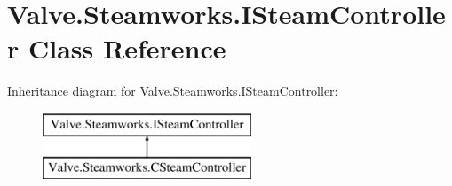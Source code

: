 \hypertarget{classValve_1_1Steamworks_1_1ISteamController}{}\section{Valve.\+Steamworks.\+I\+Steam\+Controller Class Reference}
\label{classValve_1_1Steamworks_1_1ISteamController}
Inheritance diagram for Valve.\+Steamworks.\+I\+Steam\+Controller\+:\begin{figure}[H]
\begin{center}
\leavevmode
\includegraphics[height=2.000000cm]{classValve_1_1Steamworks_1_1ISteamController}
\end{center}
\end{figure}
